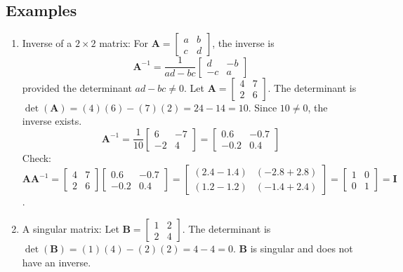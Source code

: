 \documentclass{article}
\newcommand{\mat}[1]{\bm{#1}}  %
\begin{document}
\subsection*{Examples}
\begin{enumerate}
    \item Inverse of a $2 \times 2$ matrix: For $\mat{A} = \begin{bmatrix} a & b \\ c & d \end{bmatrix}$, the inverse is
    \[ \mat{A}^{-1} = \frac{1}{ad-bc} \begin{bmatrix} d & -b \\ -c & a \end{bmatrix} \]
    provided the determinant $ad-bc \neq 0$.
    Let $\mat{A} = \begin{bmatrix} 4 & 7 \\ 2 & 6 \end{bmatrix}$. The determinant is $\det(\mat{A}) = (4)(6) - (7)(2) = 24 - 14 = 10$. Since $10 \neq 0$, the inverse exists.
    \[ \mat{A}^{-1} = \frac{1}{10} \begin{bmatrix} 6 & -7 \\ -2 & 4 \end{bmatrix} = \begin{bmatrix} 0.6 & -0.7 \\ -0.2 & 0.4 \end{bmatrix} \]
    Check: $\mat{A}\mat{A}^{-1} = \begin{bmatrix} 4 & 7 \\ 2 & 6 \end{bmatrix} \begin{bmatrix} 0.6 & -0.7 \\ -0.2 & 0.4 \end{bmatrix} = \begin{bmatrix} (2.4-1.4) & (-2.8+2.8) \\ (1.2-1.2) & (-1.4+2.4) \end{bmatrix} = \begin{bmatrix} 1 & 0 \\ 0 & 1 \end{bmatrix} = \mat{I}$.

    \item A singular matrix: Let $\mat{B} = \begin{bmatrix} 1 & 2 \\ 2 & 4 \end{bmatrix}$. The determinant is $\det(\mat{B}) = (1)(4) - (2)(2) = 4 - 4 = 0$. $\mat{B}$ is singular and does not have an inverse.
\end{enumerate}
\end{document}
